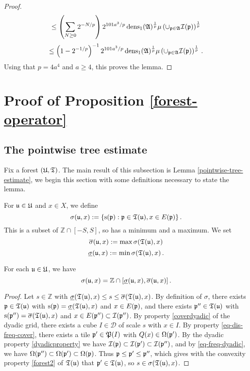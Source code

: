 {\begin{proof}
\begin{equation}
\le \left(\sum_{N\ge 0} 2^{-N/p}\right)2^{101a^3/p}\operatorname{\operatorname{dens}}_1(\mathfrak{A})^{{\frac{1}{p}}}\mu\left(\cup_{{\mathfrak p}\in\mathfrak{A}}{\mathcal{I}}({\mathfrak p})\right)^{{\frac{1}{p}}}
\end{equation}
\begin{equation}
\le \left(1-2^{-1/p}\right)^{-1}
2^{101a^3/p}
\operatorname{\operatorname{dens}}_1(\mathfrak{A})^{\frac 1p}\mu\left(\cup_{{\mathfrak p}\in\mathfrak{A}}{\mathcal{I}}({\mathfrak p})\right)^{\frac 1p}\, .
\end{equation}
Using that $p = 4a^4$ and $a \ge 4$, this proves the lemma.
\end{proof}







\chapter{Proof of Proposition \ref{forest-operator}}

\label{treesection}

\section{The pointwise tree estimate}
Fix a forest $({\mathfrak U}, {\mathfrak T})$. The main result of this subsection is Lemma \ref{pointwise-tree-estimate}, we begin this section with some definitions necessary to state the lemma.

For ${\mathfrak u} \in {\mathfrak U}$ and $x\in X$, we define
$$
    \sigma ({\mathfrak u}, x):=\{{\mathrm{s}}({\mathfrak p}):{\mathfrak p}\in {\mathfrak T}({\mathfrak u}), x\in E({\mathfrak p})\}\,.
$$
This is a subset of $\mathbb{Z} \cap [-S, S]$, so has a minimum and a maximum. We set
$$
    \overline{\sigma} ({\mathfrak u}, x) := \max \sigma({\mathfrak T}({\mathfrak u}), x)
$$
$$
    \underline{\sigma} ({\mathfrak u}, x) := \min\sigma({\mathfrak T}({\mathfrak u}), x)\,.
$$
\begin{lemma}
\label{convex-scales}
    For each ${\mathfrak u} \in {\mathfrak U}$, we have
    $$
        \sigma({\mathfrak u}, x) = \mathbb{Z} \cap [\underline{\sigma} ({\mathfrak u}, x), \overline{\sigma} ({\mathfrak u}, x)]\,.
    $$
\end{lemma}

\begin{proof}
    Let $s \in \mathbb{Z}$ with $\underline{\sigma} ({\mathfrak T}({\mathfrak u}), x) \le s \le \overline{\sigma} ({\mathfrak T}({\mathfrak u}), x)$. By definition of $\sigma$, there exists ${\mathfrak p} \in {\mathfrak T}({\mathfrak u})$ with ${\mathrm{s}}({\mathfrak p}) = \underline{\sigma} ({\mathfrak T}({\mathfrak u}), x)$ and $x \in E({\mathfrak p})$, and there exists ${\mathfrak p}'' \in {\mathfrak T}({\mathfrak u})$ with ${\mathrm{s}}({\mathfrak p}'') = \overline{\sigma} ({\mathfrak T}({\mathfrak u}), x)$ and $x \in E({\mathfrak p}'') \subset {\mathcal{I}}({\mathfrak p}'')$. By property \eqref{coverdyadic} of the dyadic grid, there exists a cube $I \in \mathcal{D}$ of scale $s$ with $x \in I$. By property \eqref{eq-dis-freq-cover}, there exists a tile ${\mathfrak p}' \in {\mathfrak P}(I)$ with ${Q}(x) \in {\Omega}({\mathfrak p}')$. By the dyadic property \eqref{dyadicproperty}  we have ${\mathcal{I}}({\mathfrak p}) \subset {\mathcal{I}}({\mathfrak p}') \subset {\mathcal{I}}({\mathfrak p}'')$, and by \eqref{eq-freq-dyadic}, we have ${\Omega}({\mathfrak p}'') \subset {\Omega}({\mathfrak p}') \subset {\Omega}({\mathfrak p})$. Thus ${\mathfrak p} \le {\mathfrak p}' \le{\mathfrak p}''$, which gives with the convexity property \eqref{forest2} of ${\mathfrak T}({\mathfrak u})$ that ${\mathfrak p}' \in {\mathfrak T}({\mathfrak u})$, so $s \in \sigma({\mathfrak T}({\mathfrak u}), x)$.
\end{proof}

}
